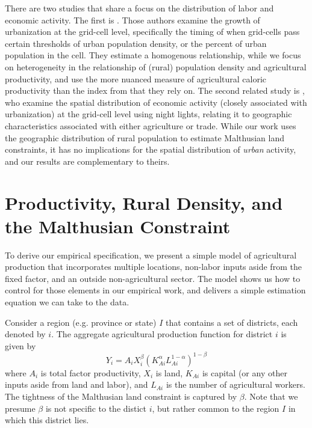 \documentclass[11pt]{article}
\begin{document}
There are two studies that share a focus on the distribution of labor and economic activity. The first is \citet{mfm2014}. Those authors examine the growth of urbanization at the grid-cell level, specifically the timing of when grid-cells pass certain thresholds of urban population density, or the percent of urban population in the cell. They estimate a homogenous relationship, while we focus on heterogeneity in the relationship of (rural) population density and agricultural productivity, and use the more nuanced measure of agricultural caloric productivity than the index from \citet{ramankutty2002} that they rely on. The second related study is \citet{hssw2016}, who examine the spatial distribution of economic activity (closely associated with urbanization) at the grid-cell level using night lights, relating it to geographic characteristics associated with either agriculture or trade. While our work uses the geographic distribution of rural population to estimate Malthusian land constraints, it has no implications for the spatial distribution of \textit{urban} activity, and our results are complementary to theirs.

\section{Productivity, Rural Density, and the Malthusian Constraint}\label{SEC_agmodel}
To derive our empirical specification, we present a simple model of agricultural production that incorporates multiple locations, non-labor inputs aside from the fixed factor, and an outside non-agricultural sector. The model shows us how to control for those elements in our empirical work, and delivers a simple estimation equation we can take to the data. 

Consider a region (e.g. province or state) $I$ that contains a set of districts, each denoted by $i$. The aggregate agricultural production function for district $i$ is given by 
\begin{equation}
Y_{i} = A_{i} X_{i}^{\beta} \left(K_{Ai}^{\alpha}L_{Ai}^{1-\alpha}\right)^{1-\beta} \label{EQ_production}
\end{equation}
where $A_{i}$ is total factor productivity, $X_{i}$ is land, $K_{Ai}$ is capital (or any other inputs aside from land and labor), and $L_{Ai}$ is the number of agricultural workers. The tightness of the Malthusian land constraint is captured by $\beta$. Note that we presume $\beta$ is not specific to the distict $i$, but rather common to the region $I$ in which this district lies.
\end{document}
